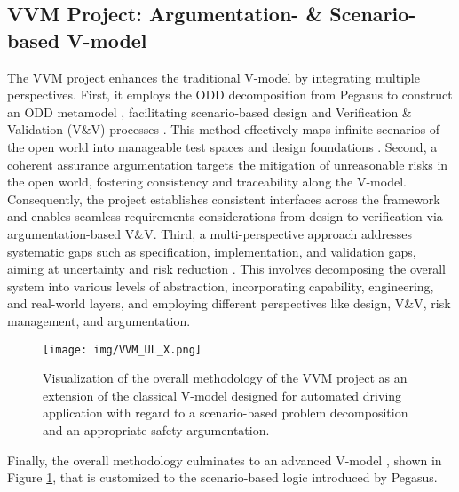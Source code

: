 \subsection{VVM Project: Argumentation- \& Scenario-based V-model}\label{VVM}

The VVM project enhances the traditional V-model \cite{brohl1993v} by integrating multiple perspectives. First, it employs the ODD decomposition from Pegasus \cite{schuldt2013effiziente, pegasus_schlussbericht} to construct an ODD metamodel \cite{scholtes20216, reich2023concept}, facilitating scenario-based design and Verification \& Validation (V\&V) processes \cite{elster2021fundamental}. This method effectively maps infinite scenarios of the open world into manageable test spaces and design foundations \cite{neurohr2021criticality}. Second, a coherent assurance argumentation \cite{VVMAssurance} targets the mitigation of unreasonable risks in the open world, fostering consistency and traceability along the V-model. Consequently, the project establishes consistent interfaces across the framework and enables seamless requirements considerations from design to verification via argumentation-based V\&V. Third, a multi-perspective approach \cite{VVMAPerspectives} addresses systematic gaps such as specification, implementation, and validation gaps, aiming at uncertainty and risk reduction \cite{stellet2019formalisation}. This involves decomposing the overall system into various levels of abstraction, incorporating capability, engineering, and real-world layers, and employing different perspectives like design, V\&V, risk management, and argumentation.

\begin{figure}[]
	\centering	
	\texttt{[image: img/VVM\_UL\_X.png]}
	\caption{Visualization of the overall methodology of the VVM project \cite{VVMOverall} as an extension of the classical V-model designed for automated driving application with regard to a scenario-based problem decomposition and an appropriate safety argumentation.}
	\label{fig:VVM}
\end{figure}

Finally, the overall methodology culminates to an advanced V-model \cite{VVMOverall}, shown in Figure \ref{fig:VVM}, that is customized to the scenario-based logic introduced by Pegasus. 

